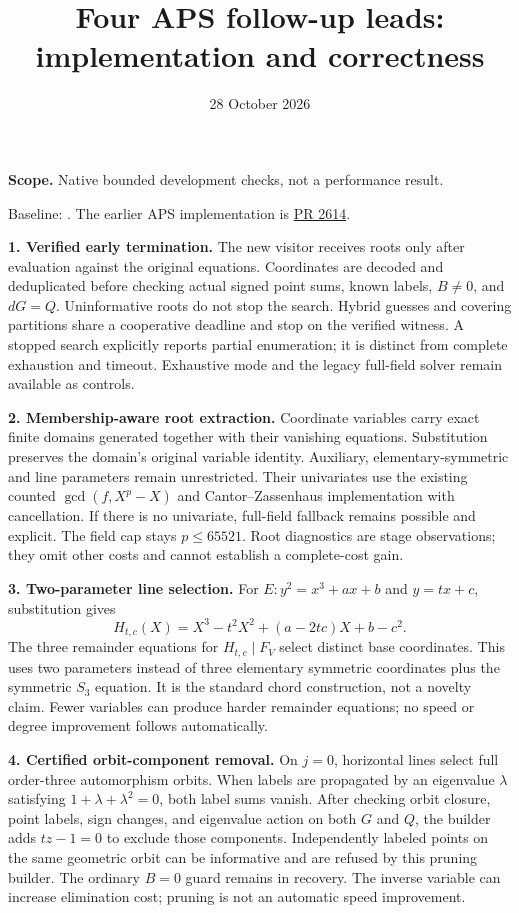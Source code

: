 \documentclass[10pt]{article}
\title{Four APS follow-up leads: implementation and correctness}
\author{}
\date{28 October 2026}
\begin{document}
\maketitle
\textbf{Scope.} Native bounded development checks, not a performance result.
\par Baseline: .
The earlier APS implementation is
\href{https://github.com/isogeny-labs/crypto/pull/2614}{PR 2614}.

\textbf{1. Verified early termination.}
The new visitor receives roots only after evaluation against the original
equations. Coordinates are decoded and deduplicated before checking actual
signed point sums, known labels, $B\ne0$, and $dG=Q$.
Uninformative roots do not stop the search. Hybrid guesses and covering
partitions share a cooperative deadline and stop on the verified witness.
A stopped search explicitly reports partial enumeration; it is distinct from
complete exhaustion and timeout. Exhaustive mode and the legacy full-field
solver remain available as controls.

\textbf{2. Membership-aware root extraction.}
Coordinate variables carry exact finite domains generated together with
their vanishing equations. Substitution preserves the domain's original
variable identity. Auxiliary, elementary-symmetric and line parameters
remain unrestricted. Their univariates use the existing counted
$\gcd(f,X^p-X)$ and Cantor--Zassenhaus implementation with cancellation.
If there is no univariate, full-field fallback remains possible and explicit.
The field cap stays $p\le65521$. Root diagnostics are stage observations;
they omit other costs and cannot establish a complete-cost gain.

\textbf{3. Two-parameter line selection.}
For $E:y^2=x^3+ax+b$ and $y=tx+c$, substitution gives
\[
 H_{t,c}(X)=X^3-t^2X^2+(a-2tc)X+b-c^2.
\]
The three remainder equations for $H_{t,c}\mid F_V$ select distinct base
coordinates. This uses two parameters instead of three elementary symmetric
coordinates plus the symmetric $S_3$ equation. It is the standard chord
construction, not a novelty claim. Fewer variables can produce harder
remainder equations; no speed or degree improvement follows automatically.

\textbf{4. Certified orbit-component removal.}
On $j=0$, horizontal lines select full order-three automorphism orbits.
When labels are propagated by an eigenvalue $\lambda$ satisfying
$1+\lambda+\lambda^2=0$, both label sums vanish. After checking orbit closure,
point labels, sign changes, and eigenvalue action on both $G$ and $Q$, the
builder adds $tz-1=0$ to exclude those components. Independently labeled
points on the same geometric orbit can be informative and are refused by
this pruning builder. The ordinary $B=0$ guard remains in recovery.
The inverse variable can increase elimination cost; pruning is not an
automatic speed improvement.
\end{document}
